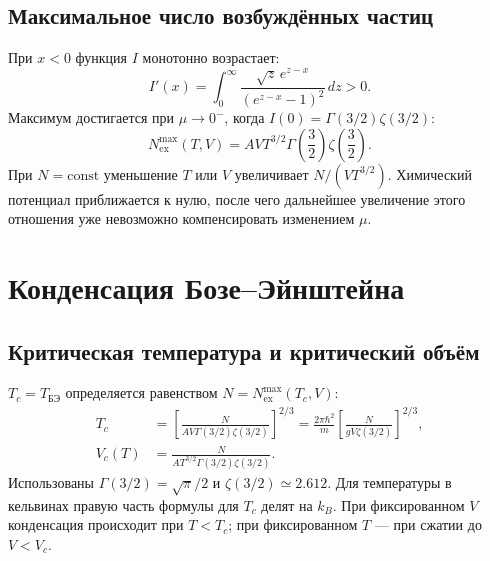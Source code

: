 \documentclass[../final.tex]{subfiles}
\begin{document}
\subsection{Максимальное число возбуждённых частиц}
При $x<0$ функция $I$ монотонно возрастает:
\begin{equation*}
 I'(x)=\int_0^\infty
 \frac{\sqrt z\,e^{z-x}}{(e^{z-x}-1)^2}\,dz>0.
\end{equation*}
Максимум достигается при $\mu\to0^{-}$, когда
$I(0)=\Gamma(3/2)\zeta(3/2)$:
\begin{equation*}
 N_{\mathrm{ex}}^{\max}(T,V)=
 AVT^{3/2}\Gamma\!\left(\frac32\right)\zeta\!\left(\frac32\right).
\end{equation*}
При $N=\mathrm{const}$ уменьшение $T$ или $V$ увеличивает $N/(VT^{3/2})$.
Химический потенциал приближается к нулю, после чего дальнейшее увеличение
этого отношения уже невозможно компенсировать изменением $\mu$.

\section{Конденсация Бозе--Эйнштейна}
\subsection{Критическая температура и критический объём}
 $T_c=T_{\text{БЭ}}$
определяется равенством $N=N_{\mathrm{ex}}^{\max}(T_c,V)$:
\begin{align*}
 T_c&=\left[
 \frac{N}{AV\Gamma(3/2)\zeta(3/2)}\right]^{2/3}
 =\frac{2\pi\hbar^2}{m}
 \left[\frac{N}{gV\zeta(3/2)}\right]^{2/3},\\
 V_c(T)&=\frac{N}{AT^{3/2}\Gamma(3/2)\zeta(3/2)}.
\end{align*}
Использованы $\Gamma(3/2)=\sqrt\pi/2$ и $\zeta(3/2)\simeq2.612$.
Для температуры в кельвинах правую часть формулы для $T_c$ делят на $k_B$.
При фиксированном $V$ конденсация происходит при $T<T_c$;
при фиксированном $T$ --- при сжатии до $V<V_c$.

\clearpage
\end{document}

